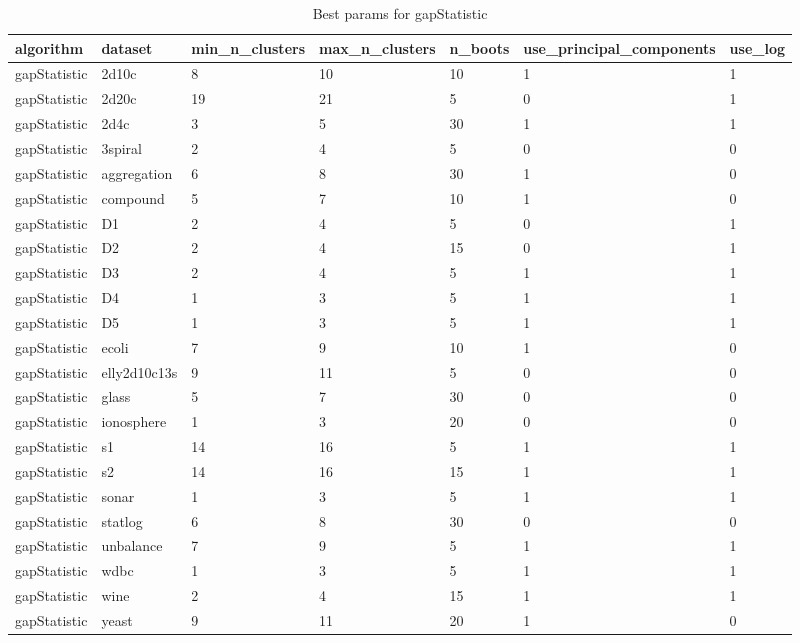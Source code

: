 \begin{table}[H]
\centering
\caption{Best params for gapStatistic}
\label{tab:params:gapStatistic}
\begin{tabular}{|l|l|l|l|l|l|l|}
\hline
algorithm & dataset & min\_n\_clusters & max\_n\_clusters & n\_boots & use\_principal\_components & use\_log \\
\hline
gapStatistic & 2d10c & 8 & 10 & 10 & 1 & 1 \\
\hline
gapStatistic & 2d20c & 19 & 21 & 5 & 0 & 1 \\
\hline
gapStatistic & 2d4c & 3 & 5 & 30 & 1 & 1 \\
\hline
gapStatistic & 3spiral & 2 & 4 & 5 & 0 & 0 \\
\hline
gapStatistic & aggregation & 6 & 8 & 30 & 1 & 0 \\
\hline
gapStatistic & compound & 5 & 7 & 10 & 1 & 0 \\
\hline
gapStatistic & D1 & 2 & 4 & 5 & 0 & 1 \\
\hline
gapStatistic & D2 & 2 & 4 & 15 & 0 & 1 \\
\hline
gapStatistic & D3 & 2 & 4 & 5 & 1 & 1 \\
\hline
gapStatistic & D4 & 1 & 3 & 5 & 1 & 1 \\
\hline
gapStatistic & D5 & 1 & 3 & 5 & 1 & 1 \\
\hline
gapStatistic & ecoli & 7 & 9 & 10 & 1 & 0 \\
\hline
gapStatistic & elly2d10c13s & 9 & 11 & 5 & 0 & 0 \\
\hline
gapStatistic & glass & 5 & 7 & 30 & 0 & 0 \\
\hline
gapStatistic & ionosphere & 1 & 3 & 20 & 0 & 0 \\
\hline
gapStatistic & s1 & 14 & 16 & 5 & 1 & 1 \\
\hline
gapStatistic & s2 & 14 & 16 & 15 & 1 & 1 \\
\hline
gapStatistic & sonar & 1 & 3 & 5 & 1 & 1 \\
\hline
gapStatistic & statlog & 6 & 8 & 30 & 0 & 0 \\
\hline
gapStatistic & unbalance & 7 & 9 & 5 & 1 & 1 \\
\hline
gapStatistic & wdbc & 1 & 3 & 5 & 1 & 1 \\
\hline
gapStatistic & wine & 2 & 4 & 15 & 1 & 1 \\
\hline
gapStatistic & yeast & 9 & 11 & 20 & 1 & 0 \\
\hline
\end{tabular}
\end{table}